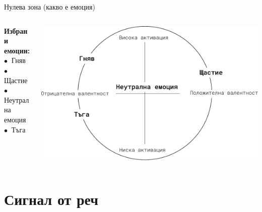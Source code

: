 \documentclass[9pt]{beamer}
\begin{document}
    \begin{frame}{Нулева зона (какво е емоция)}
        \begin{columns}[T] %
            \begin{column}{.38\textwidth}
                \textbf{Избрани емоции:}
                \vspace{1cm}\\
                $\bullet\ $ Гняв
                \vspace{1cm}\\
                $\bullet\ $ Щастие
                \vspace{1cm}\\
                $\bullet\ $ Неутрална емоция
                \vspace{1cm}\\
                $\bullet\ $ Тъга
            \end{column}%
            \hfill%
            \begin{column}{.60\textwidth}
                \vspace{1cm}
                \begin{center}
                    \includegraphics[width=\textwidth]{valence_arousal_ahns}%
                \end{center}
            \end{column}%
        \end{columns}
    \end{frame}

    \section{Сигнал от реч}
\end{document}

